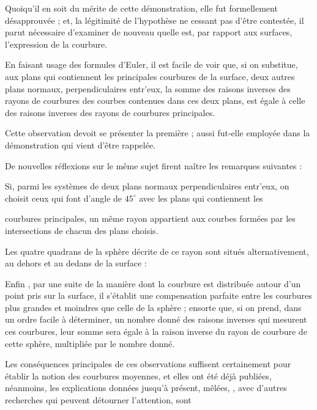 \documentclass[11pt,a4paper]{article}
\begin{document}
Quoiqu'il en soit du mérite de cette démonstration, elle fut formellement
désapprouvée ; et, la légitimité de l'hypothèse ne cessant pas d'être
contestée, il parut nécessaire d'examiner de nouveau quelle est, par rapport
aux surfaces, l'expression de la courbure.

En faisant usage des formules d'Euler, il est facile de voir que, si on
substitue, aux plans qui contiennent les principales courbures de la surface,
deux autres plans normaux, perpendiculaires entr'eux, la somme des raisons
inverses des rayons de courbures des courbes contenues dans ces deux plans,
est égale à celle des raisons inverses des \ill{} rayons de courbures
principales.

Cette observation devoit se présenter la première ; aussi fut-elle employée
dans la démonstration qui vient d'être rappelée.

De nouvelles réflexions sur le même sujet firent naître les remarques
suivantes :

Si, parmi les systèmes de deux plans normaux perpendiculaires entr'eux, on
choisit ceux qui font d'angle de $45^{\circ}$ avec les plans qui contiennent
les


courbures principales, un même rayon appartient aux courbes formées par les
intersections de chacun des plans choisis.

Les quatre quadrans de la sphère décrite de ce rayon sont situés
alternativement, au dehors et au dedans de la surface :

Enfin \ill{}, par une suite de la manière dont la courbure est distribuée
autour d'un point pris sur la surface, il s'établit une compensation parfaite
entre les courbures plus grandes et moindres que celle de la sphère ; ensorte
que, si on prend, dans un ordre facile à déterminer, un nombre donné des
raisons inverses qui mesurent ces courbures, leur somme sera égale à la
raison inverse du rayon de courbure de cette sphère, multipliée par le nombre
donné.

Les conséquences principales de ces observations suffisent certainement pour
établir la notion des courbures moyennes, et elles ont été déjà publiées,
néanmoins, les explications données jusqu'à présent, mêlées, \ill{}, avec
d'autres recherches qui peuvent détourner l'attention, sont \ill{}
\end{document}
